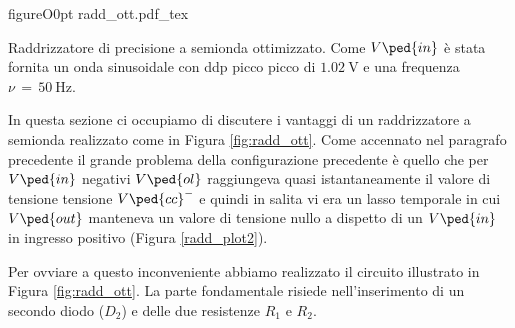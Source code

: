 \begin{wrapfloat}{figure}{O}{0pt}
        \def\svgwidth{0.5\textwidth}
        {radd_ott.pdf_tex}
        \caption{Raddrizzatore di precisione a semionda ottimizzato. Come $V\ped{in}$ è stata fornita un onda sinusoidale con ddp picco picco di $\SI{1.02}{\volt}$ e una frequenza $\nu\,=\,\SI{50}{\hertz}$.}
        \label{fig:radd_ott}
\end{wrapfloat}

In questa sezione ci occupiamo di discutere i vantaggi di un raddrizzatore a semionda realizzato come in Figura \ref{fig:radd_ott}. Come accennato nel paragrafo precedente il grande problema della configurazione precedente è quello che per $V\ped{in}$ negativi $V\ped{ol}$ raggiungeva quasi istantaneamente il valore di tensione tensione $V\ped{cc}^-$ e quindi in salita vi era un lasso temporale in cui $V\ped{out}$ manteneva un valore di tensione nullo a dispetto di un $V\ped{in}$ in ingresso positivo (Figura \ref{radd_plot2}).

Per ovviare a questo inconveniente abbiamo realizzato il circuito illustrato in Figura \ref{fig:radd_ott}. La parte fondamentale risiede nell'inserimento di un secondo diodo ($D_2$) e delle due resistenze $R_1$ e $R_2$.

